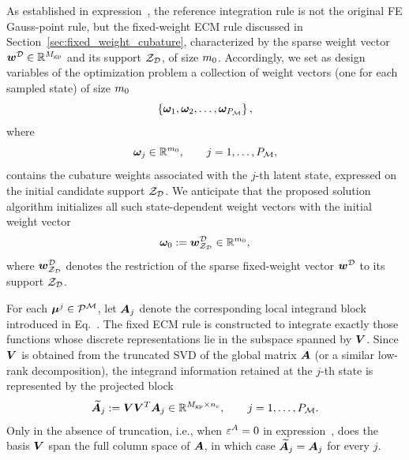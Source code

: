 \documentclass[preprint,10pt]{elsarticle}  %
\begin{document}
As established in expression~, the reference
integration rule is not the original FE Gauss-point rule, but the
fixed-weight ECM rule discussed in Section~\ref{sec:fixed_weight_cubature}, characterized by the sparse weight
vector \(\bm{w}^{\mathcal{D}}\in\mathbb{R}^{M_{\mathrm{gp}}}\) and its support \(\mathcal{Z}_{\mathcal{D}}\), of size $m_0$. Accordingly, we set as design
variables of the optimization problem a  collection of
 weight vectors (one for each sampled state) of size $m_0$
\[
\left\{
\bm{\omega}_{1},
\bm{\omega}_{2},
\ldots,
\bm{\omega}_{P_{\mathcal{M}}}
\right\},
\]
where
\[
\bm{\omega}_{j}\in\mathbb{R}^{m_0},
\qquad
j=1,\ldots,P_{\mathcal{M}},
\]
contains the cubature weights associated with the   $j$-th latent state, expressed on the initial candidate support \(\mathcal{Z}_{\mathcal{D}}\). We anticipate that the proposed solution algorithm initializes all
such state-dependent weight vectors with the initial weight vector
\begin{equation}
\label{eq:initialW}
\bm{\omega}_0
:=
\bm{w}^{\mathcal{D}}_{\mathcal{Z}_{\mathcal{D}}}
\in\mathbb{R}^{m_0},
\end{equation}
where \(\bm{w}^{\mathcal{D}}_{\mathcal{Z}_{\mathcal{D}}}\) denotes the restriction of the sparse fixed-weight vector
\(\bm{w}^{\mathcal{D}}\) to its support \(\mathcal{Z}_{\mathcal{D}}\).


   For each
\(\bm{\mu}^{j}\in\mathcal{P}^{\mathcal{M}}\), let \(\bm{A}_j\) denote the corresponding local
integrand block introduced in Eq.~.   The fixed ECM rule is constructed to integrate exactly those functions
whose discrete representations lie in the subspace spanned by
\(\bm{V}\). Since \(\bm{V}\) is obtained from the truncated SVD of the
global matrix \(\bm{A}\) (or a similar low-rank decomposition), the integrand information retained at the
\(j\)-th state is represented by the projected block
\begin{equation}
\label{eq:MAW_projected_local_block}
\widetilde{\bm{A}}_j
:=
\bm{V}\bm{V}^{T}\bm{A}_j
\in
\mathbb{R}^{M_{\mathrm{gp}}\times n_c},
\qquad
j=1,\ldots,P_{\mathcal{M}} .
\end{equation}
Only in the absence of truncation, i.e., when \(\varepsilon^A=0\) in
expression~, does the basis \(\bm{V}\) span the full
column space of \(\bm{A}\), in which case
\(\widetilde{\bm{A}}_j=\bm{A}_j\) for every \(j\).
\end{document}
